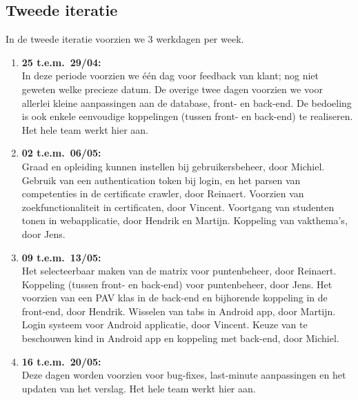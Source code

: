\documentclass[a4paper]{article}
\begin{document}
\subsection{Tweede iteratie}
In de tweede iteratie voorzien we $3$ werkdagen per week.
\begin{enumerate}[resume]
    \item \textbf{25 t.e.m.\ 29/04:}\\
    In deze periode voorzien we \'e\'en dag voor feedback van klant; nog niet geweten welke precieze datum. De overige twee dagen voorzien we voor allerlei kleine aanpassingen aan de database, front- en back-end. De bedoeling is ook enkele eenvoudige koppelingen (tussen front- en back-end) te realiseren. Het hele team werkt hier aan.
    
    \item \textbf{02 t.e.m.\ 06/05:}\\
    Graad en opleiding kunnen instellen bij gebruikersbeheer, door Michiel. Gebruik van een authentication token bij login, en het parsen van competenties in de certificate crawler, door Reinaert. Voorzien van zoekfunctionaliteit in certificaten, door Vincent. Voortgang van studenten tonen in webapplicatie, door Hendrik en Martijn. Koppeling van vakthema's, door Jens.
    
    \item \textbf{09 t.e.m.\ 13/05:}\\
    Het selecteerbaar maken van de matrix voor puntenbeheer, door Reinaert. Koppeling (tussen front- en back-end) voor puntenbeheer, door Jens. Het voorzien van een PAV klas in de back-end en bijhorende koppeling in de front-end, door Hendrik. Wisselen van tabs in Android app, door Martijn. Login systeem voor Android applicatie, door Vincent. Keuze van te beschouwen kind in Android app en koppeling met back-end, door Michiel.
    
    \item \textbf{16 t.e.m.\ 20/05:}\\
    Deze dagen worden voorzien voor bug-fixes, last-minute aanpassingen en het updaten van het verslag. Het hele team werkt hier aan.
\end{enumerate}



\newpage
\end{document}
